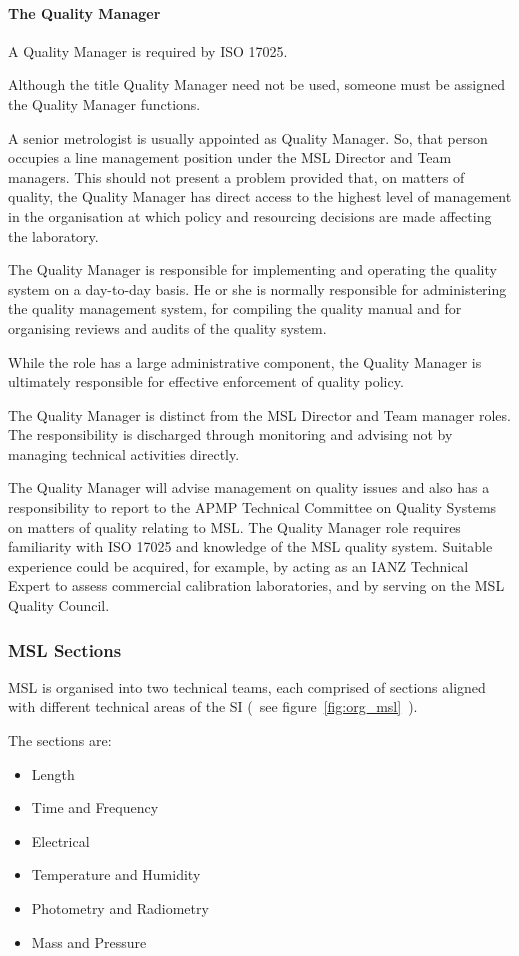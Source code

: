 \paragraph{The Quality Manager}
A Quality Manager is required by ISO 17025. 

Although the title Quality Manager need not be used, someone must be 
assigned the Quality Manager functions. 

A senior metrologist is usually appointed as Quality Manager. So, that person occupies a line management position under the MSL Director and Team managers. This should not present a problem provided that, on matters of quality, the Quality Manager has direct access to the highest level of management in the organisation at which policy and resourcing decisions are made affecting the 
laboratory.

The Quality Manager is responsible for implementing and operating the quality system on a day-to-day basis. He or she is normally responsible for administering the quality management system, for compiling the quality manual and for organising reviews and audits of the quality system.

While the role has a large administrative component, the Quality Manager is ultimately responsible for effective enforcement of quality policy. 

The Quality Manager is distinct from the MSL Director and Team manager roles. The responsibility is discharged through monitoring and advising not by managing technical activities directly.

The Quality Manager will advise management on quality issues and also has a responsibility to report to the APMP Technical Committee on Quality Systems on matters of quality relating to MSL.
The Quality Manager role requires familiarity with ISO 17025 and knowledge of the MSL quality system. Suitable experience could be acquired, for example, by acting as an IANZ Technical Expert to assess commercial calibration laboratories, and by serving on the MSL Quality Council.

\subsubsection{MSL Sections}
MSL is organised into two technical teams, each comprised of sections aligned with different technical areas of the SI (~see figure~\ref{fig:org_msl}~).

The sections are: 
\begin{itemize}
\item	Length
\item	Time and Frequency 
\item	Electrical 
\item	Temperature and Humidity
\item	Photometry and Radiometry
\item	Mass and Pressure
\end{itemize}

